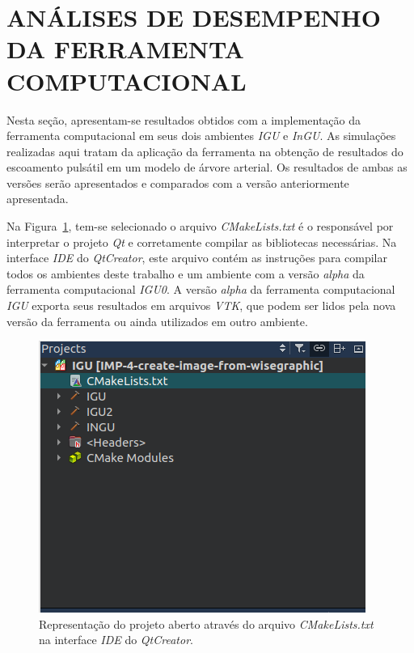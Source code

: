\section{ANÁLISES DE DESEMPENHO DA FERRAMENTA COMPUTACIONAL}\label{sec:resultados2}
\justifying

Nesta seção, apresentam-se resultados obtidos com a implementação da ferramenta computacional em seus dois ambientes \textit{IGU} e \textit{InGU}. As simulações realizadas aqui tratam da aplicação da ferramenta na obtenção de resultados do escoamento pulsátil em um modelo de árvore arterial. Os resultados de ambas as versões serão apresentados e comparados com a versão anteriormente apresentada.

Na Figura~\ref{fig:cmake}, tem-se selecionado o arquivo \textit{CMakeLists.txt} é o responsável por interpretar o projeto \textit{Qt} e corretamente compilar as bibliotecas necessárias. Na interface \textit{IDE} do \textit{QtCreator}, este arquivo contém as instruções para compilar todos os ambientes deste trabalho e um ambiente com a versão \textit{alpha} da ferramenta computacional \textit{IGU0}. A versão \textit{alpha} da ferramenta computacional \textit{IGU} exporta seus resultados em arquivos \textit{VTK}, que podem ser lidos pela nova versão da ferramenta ou ainda utilizados em outro ambiente.


\begin{figure}[!htbp]
	\centering
	\includegraphics[scale=1.5]{Figures/cmake_print.png}
	\caption{Representação do projeto aberto através do arquivo \textit{CMakeLists.txt} na interface \textit{IDE} do \textit{QtCreator}.}
	\label{fig:cmake}
\end{figure}


